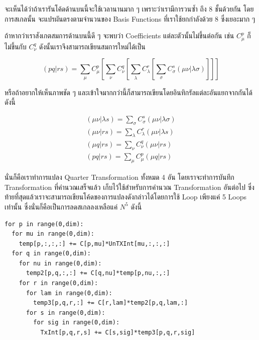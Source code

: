 \vspace{5pt}

\noindent จะเห็นได้ว่าถ้าเรารันโค้ดด้านบนนี้จะใช้เวลานานมาก ๆ เพราะว่าเรามีการวนซ้ำ  ถึง 8 ชั้นด้วยกัน โดยการสเกลนั้น%
จะแปรผันตรงตามจำนวนของ Basis Functions ที่เราใช้ยกกำลังด้วย 8 ซึ่งเยอะมาก ๆ

ถ้าหากว่าเราสังเกตสมการด้านบนนี้ดี ๆ จะพบว่า Coefficients แต่ละตัวนั้นไม่ขึ้นต่อกัน เช่น $C^{p}_\mu$ ก็ไม่ขึ้นกับ $C^{q}_\nu$
ดังนั้นเราจึงสามารถเขียนสมการใหม่ได้เป็น

\begin{equation}
  (pq\vert rs)
  =
  \sum_\mu C^{p}_\mu
  [\sum_\nu C^{q}_\nu
    [\sum_\lambda C^{r}_\lambda
      [\sum_\sigma C^{s}_\sigma(\mu\nu\vert \lambda\sigma)]]]
\end{equation}

\noindent หรือถ้าอยากให้เห็นภาพชัด ๆ และเข้าใจมากกว่านี้ก็สามารถเขียนโดยอินทิกรัลแต่ละอันแยกจากกันได้ ดังนี้

\begin{gather}
  (\mu\nu\vert \lambda s) = \sum_\sigma C^{s}_\sigma(\mu\nu\vert \lambda\sigma) \\
  (\mu\nu\vert rs) = \sum_\lambda C^{r}_\lambda(\mu\nu\vert \lambda s) \\
  (\mu q\vert rs) = \sum_\nu C^{q}_\nu(\mu\nu\vert rs) \\
  (pq\vert rs) = \sum_\mu C^{p}_\mu(\mu q\vert rs)
\end{gather}

\noindent นั่นก็คือเราทำการแปลง Quarter Transformation ทั้งหมด 4 อัน โดยเราจะทำการบันทึก Transformation ที่คำนวณเสร็จแล้ว%
เก็บไว้ใช้สำหรับการคำนวณ Transformation อันต่อไป ซึ่งท้ายที่สุดแล้วเราจะสามารถเขียนโค้ดของการแปลงดังกล่าวได้โดยการใช้ Loop เพียงแค่
5 Loops เท่านั้น ซึ่งนั่นก็คือเป็นการลดสเกลลงเหลือแค่ $N^{5}$ ดังนี้

\vspace{5pt}

\begin{lstlisting}[style=MyPython]
for p in range(0,dim):  
  for mu in range(0,dim):  
    temp[p,:,:,:] += C[p,mu]*UnTXInt[mu,:,:,:]  
  for q in range(0,dim):  
    for nu in range(0,dim):  
      temp2[p,q,:,:] += C[q,nu]*temp[p,nu,:,:]  
    for r in range(0,dim):  
      for lam in range(0,dim):  
        temp3[p,q,r,:] += C[r,lam]*temp2[p,q,lam,:]  
      for s in range(0,dim):  
        for sig in range(0,dim):  
          TxInt[p,q,r,s] += C[s,sig]*temp3[p,q,r,sig]
\end{lstlisting}

